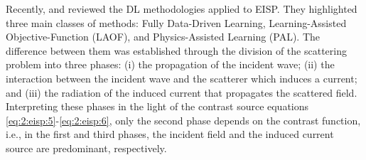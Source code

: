 		Recently, \cite{chen2020review} and \cite{salucci2022artificial} reviewed the DL methodologies applied to EISP. They highlighted three main classes of methods: Fully Data-Driven Learning, Learning-Assisted Objective-Function (LAOF), and Physics-Assisted Learning (PAL). The difference between them was established through the division of the scattering problem into three phases: (i) the propagation of the incident wave; (ii) the interaction between the incident wave and the scatterer which induces a current; and (iii) the radiation of the induced current that propagates the scattered field. Interpreting these phases in the light of the contrast source equations \eqref{eq:2:eisp:5}-\eqref{eq:2:eisp:6}, only the second phase depends on the contrast function, i.e., in the first and third phases, the incident field and the induced current source are predominant, respectively.
		

